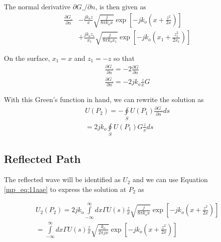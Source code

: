 The normal derivative $\partial G\_/\partial n$, is then given as
\begin{equation}
\begin{aligned}
\frac{\partial G\_}{\partial n}&-\frac{jk_oz}{x}\sqrt{\frac{j}{8\pi k_ox}}\exp\left[-jk_o\left(x + \frac{z^2}{2x}\right) \right] \\
&+\frac{jk_oz_1}{x_1}\sqrt{\frac{j}{8\pi k_ox_1}}\exp\left[-jk_o\left(x_1 + \frac{z_1^2}{2x_1}\right) \right]
\end{aligned}
\label{mp_eq:11aac}
\end{equation}
\renewcommand{\baselinestretch}{2} \small\normalsize

On the surface, $x_1 = x$ and $z_1 = -z$ so that
\begin{equation}
\begin{gathered}
\frac{\partial G\_}{\partial n} = -2\frac{\partial G}{\partial n} \\
\frac{\partial G\_}{\partial n} = -2jk_o\frac{z}{x}G
\end{gathered}
\label{mp_eq:11aad}
\end{equation}
\renewcommand{\baselinestretch}{2} \small\normalsize

With this Green's function in hand, we can rewrite the solution as
\begin{equation}
\begin{gathered}
U(P_2) = -\oint\limits_{S}U(P_1)\frac{\partial G\_}{\partial n}ds\\
= 2jk_o\oint\limits_{S}U(P_1)G\frac{z}{x}ds
\end{gathered}
\label{mp_eq:11aae}
\end{equation}
\renewcommand{\baselinestretch}{2} \small\normalsize

\subsection{Reflected Path}
The reflected wave will be identified as $U_2$ and we can use Equation \ref{mp_eq:11aae} to express the solution at $P_2$ as

\begin{equation}
\begin{gathered}
U_2(P_2) = 2jk_o\int\limits_{-\infty}^{\infty}dx\Gamma U(s)\frac{z}{x}\sqrt{\frac{j}{8\pi k_o x}}\exp\left[-jk_o\left(x +\frac{z^2}{2x} \right) \right] \\
= \int\limits_{-\infty}^{\infty}dx\Gamma U(s)\frac{z}{x}\sqrt{\frac{k_o}{2\pi j x}}\exp\left[-jk_o\left(x +\frac{z^2}{2x} \right) \right] \\
\end{gathered}
\label{mp_eq:11aaf}
\end{equation}
\renewcommand{\baselinestretch}{2} \small\normalsize

